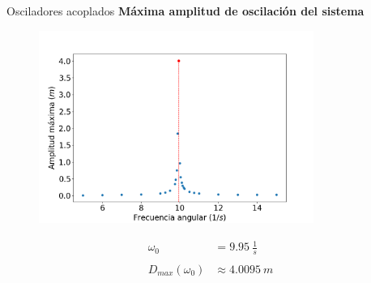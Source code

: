 \begin{frame}{Osciladores acoplados}
    \textbf{Máxima amplitud de oscilación del sistema}
    \begin{minipage}[c]{0.7\linewidth}
        \begin{figure}[H]
            \centering
            \includegraphics[width=0.8\textwidth]{pic/05-results/system_max_amplitude}
            \label{fig:system-max-amplitude}
        \end{figure}
    \end{minipage}
    \begin{minipage}[c]{0.25\linewidth}
        \large{
            \begin{equation*}
                \begin{aligned}
                    \omega_0 &= 9.95\ \frac{1}{s} \\ \\
                    D_{max}(\omega_0) &\approx 4.0095\ m
                \end{aligned}
            \end{equation*}
        }
    \end{minipage}
\end{frame}


